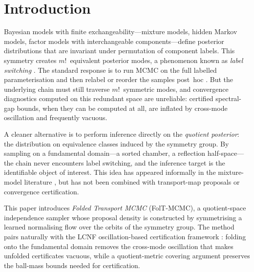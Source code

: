 %  

\section{Introduction}
\label{sec:introduction}

Bayesian models with finite exchangeability---mixture models,
hidden Markov models, factor models with interchangeable
components---define posterior distributions that are invariant
under permutation of component labels.  This symmetry creates
$m!$~equivalent posterior modes, a phenomenon known as \emph{label
switching} \citep{Stephens2000,Jasra2005,Celeux2000}.
The standard response is to run MCMC on the full labelled
parameterisation and then relabel or reorder the samples post~hoc
\citep{FruhwirthSchnatter2001,Papastamoulis2010}.
But the underlying chain must still traverse $m!$~symmetric modes,
and convergence diagnostics computed on this redundant space are
unreliable: certified spectral-gap bounds, when they can be
computed at all, are inflated by cross-mode oscillation and
frequently vacuous.

A cleaner alternative is to perform inference directly on the
\emph{quotient posterior}: the distribution on equivalence classes
induced by the symmetry group.  By sampling on a fundamental
domain---a sorted chamber, a reflection half-space---the chain
never encounters label switching, and the inference target is the
identifiable object of interest.  This idea has appeared informally
in the mixture-model literature
\citep{Celeux2000,FruhwirthSchnatter2001}, but has not been
combined with transport-map proposals or convergence certification.

This paper introduces \emph{Folded Transport MCMC} (FolT-MCMC),
a quotient-space independence sampler whose proposal density is
constructed by symmetrising a learned normalising flow over the
orbits of the symmetry group.  The method pairs naturally with the
LCNF oscillation-based certification framework
\citep{LCNF,CerTMCMC}: folding onto the fundamental domain
removes the cross-mode oscillation that makes unfolded certificates
vacuous, while a quotient-metric covering argument preserves the
ball-mass bounds needed for certification.

